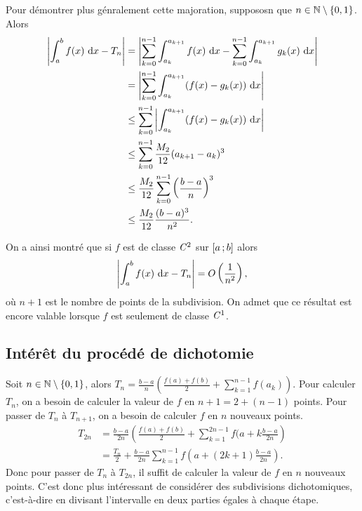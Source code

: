 Pour démontrer plus génralement cette majoration, suppososn que $n \in \mathbb{N}\setminus\{0,1\}$. Alors
\begin{align}
  \left|\int_a^b f(x)\,\mathop{}\mathopen{}\mathrm{d} x-T_{n}\right| &= \left| \sum_{k=0}^{n-1} \int_{a_k}^{a_{k+1}} f(x)\,\mathop{}\mathopen{}\mathrm{d} x -  \sum_{k=0}^{n-1} \int_{a_k}^{a_{k+1}} g_k(x)\,\mathop{}\mathopen{}\mathrm{d} x \right| \\
  &= \left| \sum_{k=0}^{n-1} \int_{a_k}^{a_{k+1}} (f(x) -g_k(x))\,\mathop{}\mathopen{}\mathrm{d} x \right| \\
  &\leq \sum_{k=0}^{n-1} \left|\int_{a_k}^{a_{k+1}} (f(x) -g_k(x))\,\mathop{}\mathopen{}\mathrm{d} x \right| \\
  &\leq \sum_{k=0}^{n-1} \frac{M_2}{12} (a_{k+1}-a_k)^3 \\
  &\leq \frac{M_2}{12} \sum_{k=0}^{n-1} \left(\frac{b-a}{n}\right)^3 \\
  &\leq \frac{M_2}{12} \frac{(b-a)^3}{n^2}.
\end{align}

On a ainsi montré que si $f$ est de classe $\mathit{C}^2$ sur $\left[ a \, ;  b \right]$ alors
\begin{equation}
  \left|\int_a^b f(x)\,\mathop{}\mathopen{}\mathrm{d} x-T_n \right| = O\left(\frac{1}{n^2}\right),
\end{equation}
où $n+1$ est le nombre de points de la subdivision. On admet que ce résultat est encore valable lorsque $f$ est seulement de classe $\mathit{C}^1$.

\subsection{Intérêt du procédé de dichotomie}

Soit $n \in \mathbb{N}\setminus\{0,1\}$, alors $T_n = \frac{b-a}{n}\left(\frac{f(a)+f(b)}{2} + \sum_{k=1}^{n-1}f(a_k)\right)$. Pour calculer $T_n$, on a besoin de calculer la valeur de $f$ en $n+1=2+(n-1)$ points. Pour passer de $T_n$ à $T_{n+1}$, on a besoin de calculer $f$ en $n$ nouveaux points.
  \begin{align}
    T_{2n} &= \frac{b-a}{2n}\left(\frac{f(a)+f(b)}{2} + \sum_{k=1}^{2n-1}f(a+k \frac{b-a}{2n}\right)\\
      &=\frac{T_n}{2} + \frac{b-a}{2n}  \sum_{k=1}^{n-1}f\left(a+(2k+1)\frac{b-a}{2n}\right).
  \end{align}
Donc pour passer de $T_n$ à $T_{2n}$, il suffit de calculer la valeur de $f$ en $n$ nouveaux points. C'est donc plus intéressant de considérer des subdivisions dichotomiques, c'est-à-dire en divisant l'intervalle en deux parties égales à chaque étape.

